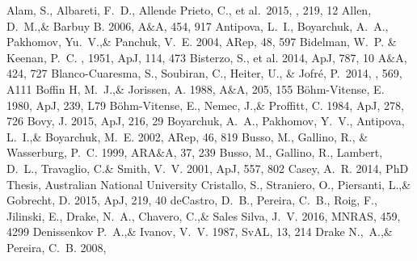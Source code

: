 \documentclass[a4paper,fleqn,usenatbib]{mnras}
\begin{document}
 


\begin{thebibliography}{99}
 Alam, S., Albareti, F.~D., Allende Prieto, C., et al.\ 2015, \apjs, 219, 12 
Allen, D.~M.,\& Barbuy B. 2006, 
A$\&$A, 454, 917
Antipova, L.~I., Boyarchuk, A.~A., Pakhomov, Yu.~V.,\& Panchuk, V.~E. 2004, 
ARep, 48, 597
Bidelman, W.~P. \& Keenan, P.~C. , 1951, ApJ, 114, 473
Bisterzo, S., et al. 2014, 
ApJ, 787, 10
A$\&$A, 424, 727
 Blanco-Cuaresma, S., Soubiran, C., Heiter, U., \& Jofr{\'e}, P.\ 2014, \aap, 569, A111 
Boffin H, M.~J.,\& Jorissen, A. 1988, 
A$\&$A, 205, 155
B\"ohm-Vitense, E. 1980, 
ApJ, 239, L79
B\"ohm-Vitense, E., Nemec, J.,\& Proffitt, C. 1984, 
ApJ, 278, 726
Bovy, J. 2015, 
ApJ, 216, 29
Boyarchuk, A.~A., Pakhomov, Y.~V., Antipova, L.~I.,\& Boyarchuk, M.~E. 2002, 
ARep, 46, 819
Busso, M., Gallino, R., \& Wasserburg, P.~C. 1999, 
ARA$\&$A, 37, 239
Busso, M., Gallino, R., Lambert, D.~L., Travaglio, C.\& Smith, V.~V. 2001, 
ApJ, 557, 802
Casey, A.~R. 2014, 
PhD Thesis, Australian National University
Cristallo, S., Straniero, O., Piersanti, L.,\& Gobrecht, D. 2015, 
ApJ, 219, 40
deCastro, D.~B., Pereira, C.~B., Roig, F., Jilinski, E., Drake, N.~A., Chavero, C.,\& Sales Silva, J.~V. 2016, 
MNRAS, 459, 4299
Denissenkov P.~A.,\& Ivanov, V.~V. 1987, 
SvAL, 13, 214
Drake N.,~A.,\& Pereira, C.~B. 2008, 

\end{thebibliography}
\end{document}
